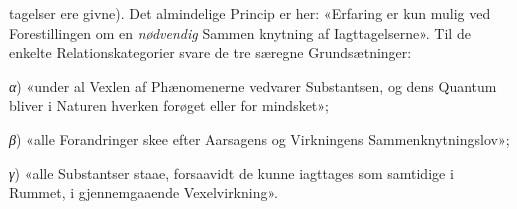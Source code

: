 \documentclass[12pt,a4paper]{book}
\newcommand{\gk}[1]{\textit{#1}}
\begin{document}
tagelser ere givne). Det almindelige Princip er her: «Erfaring
er kun mulig ved Forestillingen om en \emph{nødvendig} Sammen\-%
knytning af Iagttagelserne». Til de enkelte Relationskategorier
svare de tre særegne Grundsætninger:

\gk{α}) «under al Vexlen af Phænomenerne vedvarer Substantsen, og
dens Quantum bliver i Naturen hverken forøget eller for\-%
mindsket»;

\gk{β}) «alle Forandringer skee efter Aarsagens og Virkningens
Sammenknytningslov»;

\gk{γ}) «alle Substantser staae, forsaavidt de kunne iagttages som
samtidige i Rummet, i gjennemgaaende Vexelvirkning».
\end{document}
